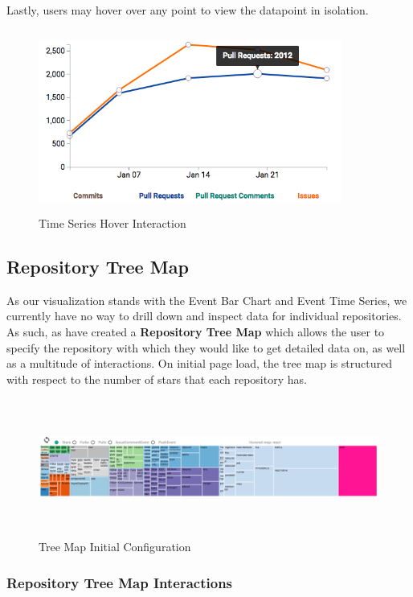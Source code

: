 \documentclass{article}
\begin{document}
Lastly, users may hover over any point to view the datapoint in isolation.

\begin{figure}[h!]
\centering
\includegraphics[height=6cm, width=10cm]{hover}
\caption{Time Series Hover Interaction}
\end{figure}

\subsection {Repository Tree Map}

As our visualization stands with the Event Bar Chart and Event Time Series, we currently have no way to drill down and inspect data for individual repositories. As such, as have created a \textbf{Repository Tree Map} which allows the user to specify the repository with which they would like to get detailed data on, as well as a multitude of interactions. On initial page load, the tree map is structured with respect to the number of stars that each repository has.

\begin{figure}[h!]
\centering
\includegraphics[height=4.5cm, width=17cm]{tree}
\caption{Tree Map Initial Configuration}
\end{figure}

\subsubsection {Repository Tree Map Interactions}
\end{document}
